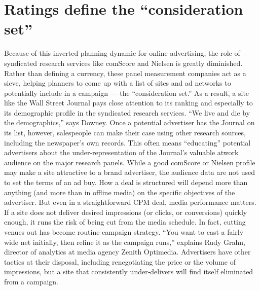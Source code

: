 \section{Ratings define the ``consideration set''}
Because of this inverted planning dynamic for online advertising, the role
of syndicated research services like comScore and Nielsen is greatly
diminished. Rather than defining a currency, these panel measurement
companies act as a sieve, helping planners to come up with a list of sites
and ad networks to potentially include in a campaign — the
``consideration set.''
As a result, a site like the Wall Street Journal pays close attention to its
ranking and especially to its demographic profile in the syndicated
research services. ``We live and die by the demographics,'' says Downey.
Once a potential advertiser has the Journal on its list, however, salespeople
can make their case using other research sources, including the
newspaper’s own records. This often means ``educating'' potential
advertisers about the under‐representation of the Journal’s valuable atwork
audience on the major research panels.
While a good comScore or Nielsen profile may make a site attractive to a
brand advertiser, the audience data are not used to set the terms of an ad
buy. How a deal is structured will depend more than anything (and more
than in offline media) on the specific objectives of the advertiser. But even
in a straightforward CPM deal, media performance matters. If a site does
not deliver desired impressions (or clicks, or conversions) quickly enough,
it runs the risk of being cut from the media schedule.
In fact, cutting venues out has become routine campaign strategy. ``You
want to cast a fairly wide net initially, then refine it as the campaign
runs,'' explains Rudy Grahn, director of analytics at media agency Zenith
Optimedia. Advertisers have other tactics at their disposal, including
renegotiating the price or the volume of impressions, but a site that
consistently under‐delivers will find itself eliminated from a campaign.
